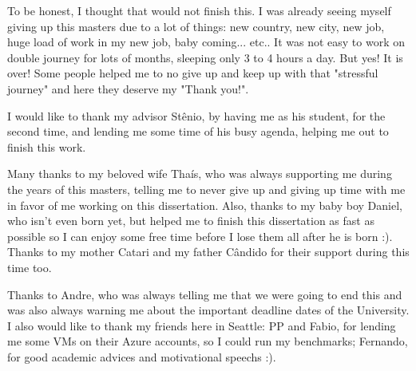 To be honest, I thought that would not finish this. I was already seeing myself giving up this masters due to a lot of
things: new country, new city, new job, huge load of work in my new job, baby coming... etc.. It was not easy to work on
double journey for lots of months, sleeping only 3 to 4 hours a day. But yes! It is over! Some people helped me to no
give up and keep up with that "stressful journey" and here they deserve my "Thank you!".

I would like to thank my advisor Stênio, by having me as his student, for the second time, and lending me some time of
his busy agenda, helping me out to finish this work.

Many thanks to my beloved wife Thaís, who was always supporting me during the years of this masters, telling me to never
give up and giving up time with me in favor of me working on this dissertation. Also, thanks to my baby boy Daniel, who
isn't even born yet, but helped me to finish this dissertation as fast as possible so I can enjoy some free time before
I lose them all after he is born :). Thanks to my mother Catari and my father Cândido for their support during this time
too.

Thanks to Andre, who was always telling me that we were going to end this and was also always warning me about the
important deadline dates of the University. I also would like to thank my friends here in Seattle: PP and Fabio, for
lending me some VMs on their Azure accounts, so I could run my benchmarks; Fernando, for good academic advices and
motivational speechs :).

